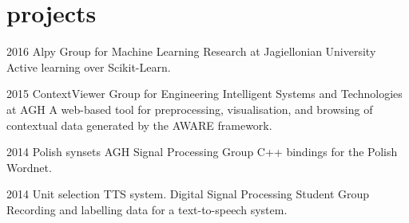 \documentclass[]{friggeri-cv_osx}
\begin{document}
\section{projects}
\begin{entrylist}
\entry
{2016}
{Alpy}
{Group for Machine Learning Research at Jagiellonian University}
{Active learning over Scikit-Learn.}

\entry
{2015}
{ContextViewer}
{Group for Engineering Intelligent Systems and Technologies at AGH}
{A web-based tool for preprocessing, visualisation, and browsing of contextual data generated by the AWARE framework.}

\entry
{2014}
{Polish synsets}
{AGH Signal Processing Group}
{C++ bindings for the Polish Wordnet.}

\entry
{2014}
{Unit selection TTS system.}
{Digital Signal Processing Student Group}
{Recording and labelling data for a text-to-speech system.}
\end{entrylist}
\end{document}
